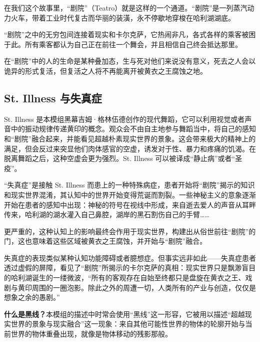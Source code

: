 在我们这个故事里，“剧院”（Teatro）就是这样的一个通道。“剧院”是一列蒸汽动力火车，带着工业时代复古而华丽的装潢，永不停歇地穿梭在哈利湖湖底。

“剧院”之中的无穷包间连接着现实和卡尔克萨，它热闹非凡，各式各样的乘客被困于此。所有乘客都认为自己正在前往一个舞会，并且相信自己终会抵达那里。

在“剧院”中的人的生命是某种叠加态，生与死对他们来说没有意义，死去之人会以诡异的形式复活，但复活之人将不再能离开被黄衣之王腐蚀之地。

\subsection{St. Illness 与失真症}
St. Illness 是本模组黑幕吉姆·格林伍德创作的现代舞蹈，它可以利用视觉或者声音中的振动规律传递黄印的概念。观众会不由自主地参与舞蹈当中，将自己的感知和“剧院”融合起来，并能看见超越朴素现实世界的景象。这会带来极大的精神上的满足，但会反过来突显他们肉体感官的空虚，诱发对于性、暴力和疼痛的饥渴。在脱离舞蹈之后，这种空虚会更为强烈。St. Illness 可以被译成“静止病”或者“圣疫”。

“失真症”是接触 St. Illness 而患上的一种特殊病症，患者开始将“剧院”揭示的知识和现实世界混淆，其认知中的世界开始变得荒诞而割裂。一些神秘主义的意象逐渐开始在患者的感知中出现：神秘的符号在视线中形成，来自逝去爱人的声音从耳畔传来，哈利湖的湖水灌入自己鼻腔，湖岸的黑石割伤自己的手臂……

更严重的，这种认知上的影响最终会作用于现实世界，构建出从俗世前往“剧院”的门，这也意味着这些区域被黄衣之王腐蚀，并开始与“剧院”融合。

失真症的表现类似某种认知功能障碍或者臆想症。但事实远非如此——失真症患者透过虚假的屏障，看见了“剧院”所揭示的卡尔克萨的真相：现实世界只是飘渺盲目的哈利湖诞生的一缕微波，“所有的客观存在自始至终都只是盘旋在黄衣之王、戏剧与黄印周围的一圈泡影。除此之外的周遭一切，人类所有的产业与创造，仅仅是想象之余的愚剧。”

\textbf{什么是黑线？}本模组的描述中时常会使用“黑线”这一形容，它被用以描述“超越现实世界的景象与现实融合”这一现象：来自其他可能性世界的物体的轮廓开始与当前世界的物体重叠出现，就像是物体移动的残影那般。
